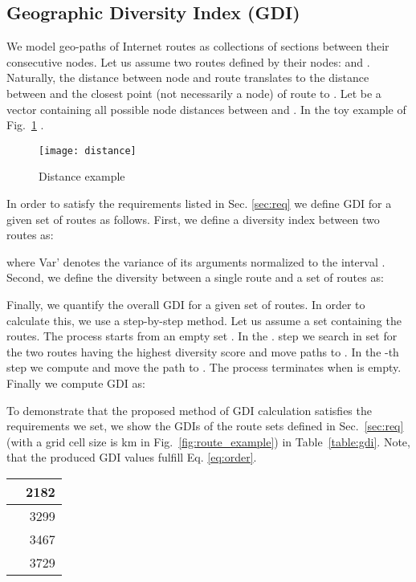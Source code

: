 \documentclass[peerreview]{IEEEtran}
\begin{document}
\subsection{Geographic Diversity Index (GDI)}

We model geo-paths of Internet routes as collections of sections between their
consecutive nodes. Let us assume two routes defined by their nodes:  and . Naturally, the distance  between node
 and route  translates to the distance between  and the closest point
(not necessarily a node) of route  to . Let  be a vector containing all
possible node distances between  and . In the toy example of
Fig.~\ref{fig:distance_example} .
\begin{comment}
Naturally, the distance between node  and route P translates to the distance
between  and  which is the closest point in route P to . The distance
between route P and route L is defined by the sum of all their node distances
and it is denoted as .
\end{comment}
\begin{figure}[b]
  \centering
  \texttt{[image: distance]}
  \caption{Distance example}
  \label{fig:distance_example}
\end{figure}

In order to satisfy the requirements listed in Sec. \ref{sec:req} we define GDI
for a given set of routes as follows. First, we define a diversity index between
two routes as:

where Var' denotes the variance of its arguments normalized to the interval
. Second, we define the diversity between a single route  and a set
of routes  as:

Finally, we quantify the overall GDI for a given set of routes. In order to
calculate this, we use a step-by-step method. Let us assume a set 
containing the routes. The process starts from an empty set .
In the . step we search in set  for the two routes having the
highest diversity score  and move paths  to
. In the -th step we compute  and move the path  to . The process
terminates when  is empty. Finally we compute GDI as:



To demonstrate that the proposed method of GDI calculation satisfies the
requirements we set, we show the GDIs of the route sets defined in
Sec.~\ref{sec:req} (with a grid cell size is  km in
Fig.~\ref{fig:route_example}) in Table~\ref{table:gdi}. Note, that the produced
GDI values fulfill Eq. \ref{eq:order}.

\begin{center}
  \begin{tabular}{ l | r }
     & 2182 \\ \hline
     & 3299 \\ \hline
    & 3467  \\ \hline
    & 3729 \\ 
  \end{tabular}
  
  \label{table:gdi}
\end{center}
 
\end{document}
